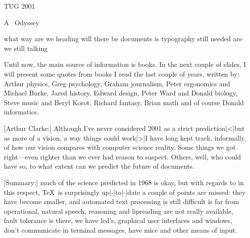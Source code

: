 
\usemodule[abr-01]

\startdocument

\StartIdea
    [ title={Hans Hagen},
     remark={PRAGMA ADE, Hasselt NL},
        url={www.pragma-ade.com}]

{\bfd \setstrut \strut TUG 2001}

{\bfa \setstrut \strut A \TEX\ Odyssey}

\blank[2*big]

\startitemize [packed]
    \startitem what way are we heading \stopitem
    \startitem will there be documents \stopitem
    \startitem is typography still needed \stopitem
    \startitem are we still talking \TEX \stopitem
\stopitemize

\StopIdea

\StartIdea

Until now, the main source of information is books. In the next couple of slides,
I will present some quotes from books I read the last couple of years, written
by: Arthur  {physics}, Greg  {psychology}, Graham
 {journalism}, Peter  {ergonomics} and Michael
Burke, Jared  {history}, Edward  {design}, Peter
Ward and Donald  {biology}, Steve  {music} and
Beryl Korot, Richard  {fantasy}, Brian 
{math} and of course Donald  {informatics}.

\StopIdea

\StartIdea
    [ title={ed. David G. Stork},
     remark={Hal's Legacy, 1997}]

[Arthur Clarke:] Although I've never considered 2001 as a strict
predict\-ion|<|but as more of a vision, a way things could work|>|I have long
kept track, informally, of how our vision compares with computer science reality.
Some things we got right---even righter than we ever had reason to suspect.
Others, well, who could have  {so, to what extent can we predict
the future of documents}.

[Summary:] much of the science predicted in 1968 is okay, but with regards to
 {in this respect, \TeX\ is surprisingly up|-|to|-|date} a
couple of points are missed: they have become smaller,  {and
automated text processing is still difficult} is far from operational, natural
speech, reasoning and lipreading are not really available, fault tolerance is
there, we have lcd's, graphical user interfaces and windows, don't communicate in
terminal messages, have mice and other means of input.

